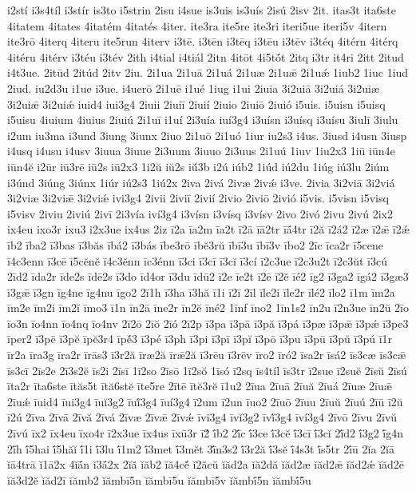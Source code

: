 {i2stí
i3s4tíl
i3stír
is3to
i5strin
2isu
i4sue
is3uis
is3uís
2isú
2isv
2it.
itas3t
ita6ste
4itatem
4itates
4itatém
4itatés
4iter.
ite3ra
ite5re
ite3ri
iteri5ue
iteri5v
4itern
ite3rō
4iterq
4iteru
ite5run
4iterv
i3tē.
i3tēn
i3tēq
i3tēu
i3tēv
i3téq
4itérn
4itérq
4itéru
4itérv
i3téu
i3tév
2ith
i4tial
i4tiál
2itn
4itōt
4i5tṓt
2itq
i3tr
it4ri
2itt
2itud
i4t3ue.
2itūd
2itúd
2itv
2iu.
2i1ua
2i1uā
2i1uá
2i1uæ
2i1uǣ
2i1uǽ
1iub2
1iuc
1iud
2iud.
iu2d3u
i1ue
i3ue.
i4uerō
2i1uē
i1ué
1iug
i1ui
2iuia
3i2uiā
3i2uiá
3i2uiæ
3i2uiǣ
3i2uiǽ
iuid4
iui3g4
2iuii
2iuiī
2iuií
2iuio
2iuiō
2iuió
i5uis.
i5uisn
i5uisq
i5uisu
4iuium
4iuius
2iuiú
2i1uī
i1uí
2i3uía
iuí3g4
i3uísn
i3uísq
i3uísu
3iulī
3iulu
i2um
iu3ma
i3und
3iung
3iunx
2iuo
2i1uō
2i1uó
1iur
iu2s3
i4us.
3iusd
i4usn
3iusp
i4usq
i4usu
i4usv
3iuua
3iuue
2i3uum
3iuuo
2i3uus
2i1uú
1iuv
1iu2x3
1iū
iūn4e
iūn4ĕ
i2ūr
iū3rē
iū2s
iū2x3
1i2ŭ
iŭ2s
iŭ́3b
i2ú
iúb2
1iúd
iú2du
1iúg
iú3lu
2iúm
i3únd
3iúng
3iúnx
1iúr
iú2s3
1iú2x
2iva
2ivá
2ivæ
2ivǽ
i3ve.
2ivia
3i2viā
3i2viá
3i2viæ
3i2viǣ
3i2viǽ
ivi3g4
2ivii
2iviī
2ivií
2ivio
2iviō
2ivió
i5vis.
i5visn
i5visq
i5visv
2iviu
2iviú
2ivī
2i3vía
iví3g4
i3vísn
i3vísq
i3vísv
2ivo
2ivó
2ivu
2ivú
2ix2
ix4eu
ixo3r
ixu3
i2x3ue
ix4us
2iz
ī2a
īa2m
īa2t
ī2ā
īā2tr
īā́4tr
ī2ă
ī2á2
ī2æ
ī2ǣ
ī2ǽ
īb2
ība2
ī3bas
ī3băs
ībá2
ī3bás
ībe3rō
ībĕ3rŭ
ībī3u
ībī3v
ībo2
2īc
īca2r
ī5cene
ī4c3enn
ī3cē
ī5cĕnĕ
ī4c3ĕnn
īc3énn
ī3ci
ī3cī
ī3cĭ
ī3cí
ī2c3ue
ī2c3u2t
ī2c3ŭt
ī3cú
2īd2
īda2r
īde2s
īdē2s
ī3do
īd4or
ī3du
īdū2
ī2e
īe2t
ī2ē
ī2ĕ
īé2
īg2
ī3ga2
īgá2
ī3gæ3
ī3gǣ
ī3gn
īg4ne
īg4nu
īgo2
2ī1h
ī3ha
ī3hă
ī1i
ī2ī
2īl
īle2i
īle2r
īlé2
īlo2
ī1m
īm2a
īm2e
īm2i
īm2ĭ
īmo3
ī1n
īn2ā
īne2r
īn2ĕ
īné2
1īnf
īno2
1īn1s2
īn2u
ī2n3ue
īn2ŭ
2īo
īo3n
īo4nn
īo4nq
īo4nv
2ī2ō
2īŏ
2īó
2ī2p
ī3pa
ī3pā
ī3pă
ī3pá
ī3pæ
ī3pǣ
ī3pǽ
ī3pe3
īper2
ī3pē
ī3pĕ
īpĕ3r4
īpĕ́3
ī3pé
ī3ph
ī3pi
ī3pī
ī3pĭ
ī3pō
ī3pu
ī3pū
ī3pŭ
ī3pú
ī1r
īr2a
īra3g
īra2r
īrās3
ī3r2ă
īræ2ă
īrǣ2ă
ī3rēu
ī3rēv
īro2
īró2
īsa2r
īsá2
īs3cæ
īs3cǣ
īs3cī
2īs2e
2ī3s2ĕ
īs2i
2īsī
1ī2so
2īsō
1ī2sŏ
1īsó
ī2sq
īs4tíl
īs3tr
ī2sue
ī2suĕ
2īsŭ
2īsú
īta2r
īta6ste
ītăs5t
ītă6stĕ
īte5re
2ītē
ītĕ3rĕ
ī1u2
2īua
2īuā
2īuă
2īuá
2īuæ
2īuǣ
2īuǽ
īuid4
īui3g4
īuĭ3g2
īuĭ́3g4
īuí3g4
ī2um
ī2un
īuo2
2īuō
2īuu
2īuŭ
2īuú
2īū
ī2ŭ
ī2ú
2īva
2īvā
2īvă
2īvá
2īvæ
2īvǣ
2īvǽ
īvi3g4
īvĭ3g2
īvĭ́3g4
īví3g4
2īvō
2īvu
2īvŭ
2īvú
īx2
īx4eu
īxo4r
ī2x3ue
īx4us
īxū3r
ī2́
ī́b2
2ī́c
ī́3ce
ī́3cĕ
ī́3cī
ī́3cĭ
2ī́d2
ī́3g2
ī́g4n
2ī́h
ī́5hai
ī́5hăĭ
ī́1i
ī́3lu
ī́1m2
ī́3met
ī́3mĕt
3ī́n3s2
ī́3r2ă
ī́3sĕ
ī́4s3t
ī́s5tr
2ī́ū
2ĭa
2ĭā
ĭā4trā
ĭ1ā2x
4ĭā́n
ĭ3ā́2x
2ĭă
ĭăb2
ĭă4cĕ́
ĭ2ăcŭ
ĭăd2a
ĭă2dă
ĭăd2æ
ĭăd2ǣ
ĭăd2ǽ
ĭăd2ē
ĭă3d2ĕ
ĭăd2ī
ĭămb2
ĭămbī5n
ĭămbī5u
ĭămbī5v
ĭămbī́5n
ĭămbī́5u
}
